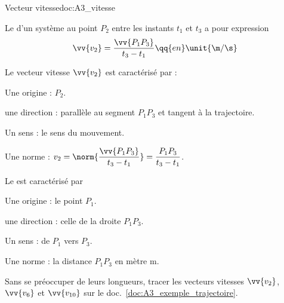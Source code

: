 \begin{doc}{Vecteur vitesse}{doc:A3_vitesse}
  \begin{importants}
    Le  d'un système au point $P_2$ entre les instants $t_1$ et $t_3$ a pour expression
    \begin{equation*}
      \vv{v_2} = \frac{\vv{P_1 P_3}}{t_3 - t_1} \qq{en} \unit{\m / \s}
    \end{equation*}
  \end{importants}
  
  Le vecteur vitesse $\vv{v_2}$ est caractérisé par :
  \begin{listePoints}[2]
    \item Une origine : $P_2$.
    \item une direction : parallèle au segment $P_1 P_3$ et tangent à la trajectoire.
    \item Un sens : le sens du mouvement.
    \item Une norme : $v_2 
    = \displaystyle \norm{\frac{\vv{P_1 P_3}}{t_3 - t_1}}
    = \displaystyle \frac{P_1 P_3}{t_3 - t_1}$.
  \end{listePoints}
  
  Le  est caractérisé par
  \begin{listePoints}[2]
    \item Une origine : le point $P_1$.
    \item une direction : celle de la droite $P_1 P_3$.
    \item Un sens : de $P_1$ vers $P_3$.
    \item Une norme : la distance $P_1 P_3$ en mètre \unit{m}.
  \end{listePoints}
\end{doc}

\mesure Sans se préoccuper de leurs longueurs, tracer les vecteurs vitesses $\vv{v_2}$, $\vv{v_6}$ et $\vv{v_{10}}$ sur le doc.~\ref{doc:A3_exemple_trajectoire}.